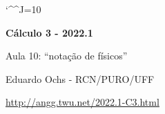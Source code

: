 \documentclass[oneside,12pt]{article}
\begin{document}
\catcode`\^^J=10
\pu
\def\pictgridstyle{\color{GrayPale}\linethickness{0.3pt}}
\def\pictaxesstyle{\linethickness{0.5pt}}
\def\pictnaxesstyle{\color{GrayPale}\linethickness{0.5pt}}
\celllower=3pt




\def\u#1{\par{\footnotesize \url{#1}}}

\def\ddx{\frac{d}{dx}}
\def\ddy{\frac{d}{dy}}
\def\ddz{\frac{d}{dz}}

\def\pictnaxesstyle{\color{Gray}\linethickness{0.5pt}}
 
\def\drafturl{http://angg.twu.net/LATEX/2022-1-C3.pdf}
\def\drafturl{http://angg.twu.net/2022.1-C3.html}
\def\draftfooter{\tiny \href{\drafturl}{\jobname{}} \ColorBrown{\shorttoday{} \hours}}



%

\thispagestyle{empty}

\begin{center}

\vspace*{1.2cm}

{\bf \Large Cálculo 3 - 2022.1}

\bsk

Aula 10: ``notação de físicos''

\bsk

Eduardo Ochs - RCN/PURO/UFF

\url{http://angg.twu.net/2022.1-C3.html}

\end{center}
\end{document}
